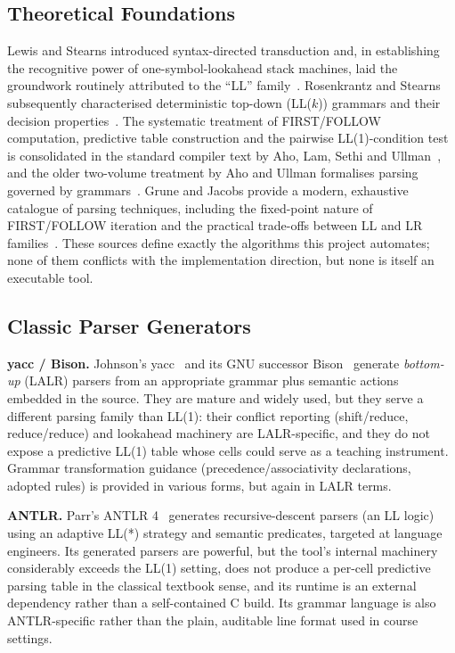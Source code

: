 \documentclass[12pt,a4paper,oneside,openany]{report}
\begin{document}
\subsection{Theoretical Foundations}
Lewis and Stearns introduced syntax-directed transduction and, in
establishing the recognitive power of one-symbol-lookahead stack machines,
laid the groundwork routinely attributed to the ``LL'' family~\cite{lewis1968}.
Rosenkrantz and Stearns subsequently characterised deterministic top-down
(LL($k$)) grammars and their decision properties~\cite{rosenkrantz1970}.
The systematic treatment of FIRST/FOLLOW computation, predictive table
construction and the pairwise LL(1)-condition test is consolidated in the
standard compiler text by Aho, Lam, Sethi and Ullman~\cite{aho2006compilers},
and the older two-volume treatment by Aho and Ullman formalises parsing
governed by grammars~\cite{aho1972}. Grune and Jacobs provide a modern,
exhaustive catalogue of parsing techniques, including the fixed-point nature
of FIRST/FOLLOW iteration and the practical trade-offs between LL and LR
families~\cite{gruene2008}. These sources define exactly the algorithms this
project automates; none of them conflicts with the implementation direction,
but none is itself an executable tool.

\subsection{Classic Parser Generators}
\textbf{yacc / Bison.} Johnson's yacc~\cite{johnson1975} and its GNU
successor Bison~\cite{bison2021} generate \emph{bottom-up} (LALR) parsers
from an appropriate grammar plus semantic actions embedded in the source.
They are mature and widely used, but they serve a different parsing family
than LL(1): their conflict reporting (shift/reduce, reduce/reduce) and
lookahead machinery are LALR-specific, and they do not expose a predictive
LL(1) table whose cells could serve as a teaching instrument. Grammar
transformation guidance (precedence/associativity declarations, adopted
rules) is provided in various forms, but again in LALR terms.

\textbf{ANTLR.} Parr's ANTLR 4~\cite{parr2013} generates recursive-descent
parsers (an LL logic) using an adaptive LL(*) strategy and semantic
predicates, targeted at language engineers. Its generated parsers are
powerful, but the tool's internal machinery considerably exceeds the
LL(1) setting, does not produce a per-cell predictive parsing table in the
classical textbook sense, and its runtime is an external dependency rather
than a self-contained C build. Its grammar language is also ANTLR-specific
rather than the plain, auditable line format used in course settings.
\end{document}
